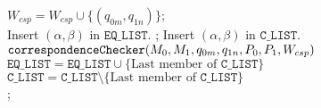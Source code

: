 \begin{algorithm}[!t]
\small
{} %
{
	  {
      $W_{csp}=W_{csp}\cup \{(q_{0m},q_{1n})\}$;\\
      Insert $(\alpha,\beta)$ in $\mathtt{EQ\_LIST}$.   
    }
		{
			  {;}			
			\Else
				{
          Insert $(\alpha,\beta)$ in $\mathtt{C\_LIST}$.\\   
          \label{line:cLIST} 
          $\mathtt{correspondenceChecker}(M_0,M_1,q_{0m},q_{1n},P_0,P_1,\newline W_{csp})$\;
          \label{line:DFS} 
        }
		} 
}
$\mathtt{EQ\_LIST}=\mathtt{EQ\_LIST}\cup\{\text{Last member of }\mathtt{C\_LIST\}}$\\
$\mathtt{C\_LIST}=\mathtt{C\_LIST}\setminus\{\text{Last member of }\mathtt{C\_LIST}\}$\\ 
; 
\caption{$\mathtt{correspondenceChecker}(M_0,M_1,q_{0i},q_{1j},P_0,P_1,\newline W_{csp})$}
\label{Algo:EVP} 
\end{algorithm}
